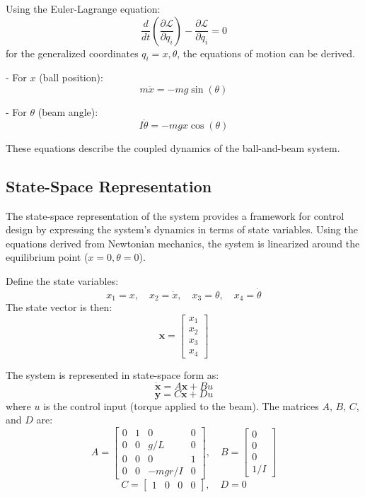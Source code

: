 \documentclass[conference]{IEEEtran}
\begin{document}
Using the Euler-Lagrange equation:
\begin{equation}
\frac{d}{dt} \left( \frac{\partial \mathcal{L}}{\partial \dot{q}_i} \right) - \frac{\partial \mathcal{L}}{\partial q_i} = 0
\end{equation}
for the generalized coordinates \(q_i = x, \theta\), the equations of motion can be derived.

- For \(x\) (ball position):
\begin{equation}
m \ddot{x} = -m g \sin(\theta)
\end{equation}

- For \(\theta\) (beam angle):
\begin{equation}
I \ddot{\theta} = -m g x \cos(\theta)
\end{equation}

These equations describe the coupled dynamics of the ball-and-beam system.

\subsection{State-Space Representation}
\label{subsec:model_ss}
The state-space representation of the system provides a framework for control design by expressing the system's dynamics in terms of state variables. Using the equations derived from Newtonian mechanics, the system is linearized around the equilibrium point (\(x = 0, \theta = 0\)).

Define the state variables:
\[
x_1 = x, \quad x_2 = \dot{x}, \quad x_3 = \theta, \quad x_4 = \dot{\theta}
\]
The state vector is then:
\[
\mathbf{x} = \begin{bmatrix} x_1 \\ x_2 \\ x_3 \\ x_4 \end{bmatrix}
\]

The system is represented in state-space form as:
\begin{equation}
\dot{\mathbf{x}} = A \mathbf{x} + B u
\end{equation}
\begin{equation}
\mathbf{y} = C \mathbf{x} + D u
\end{equation}
where \(u\) is the control input (torque applied to the beam). The matrices \(A\), \(B\), \(C\), and \(D\) are:
\[
A = \begin{bmatrix}
0 & 1 & 0 & 0 \\
0 & 0 & g/L & 0 \\
0 & 0 & 0 & 1 \\
0 & 0 & -m g r/I & 0
\end{bmatrix}, \quad
B = \begin{bmatrix}
0 \\ 0 \\ 0 \\ 1/I
\end{bmatrix}
\]
\[
C = \begin{bmatrix}
1 & 0 & 0 & 0
\end{bmatrix}, \quad
D = 0
\]
\end{document}

